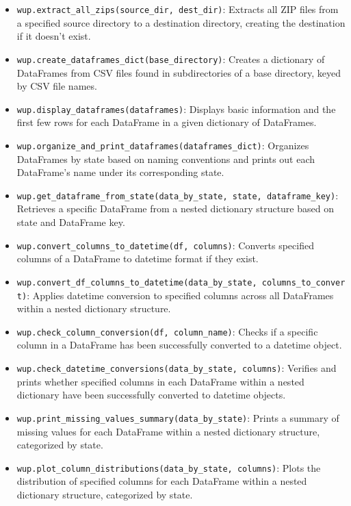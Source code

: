 \documentclass[
]{article}
\begin{document}
\begin{itemize}
\item
  \texttt{wup.extract\_all\_zips(source\_dir,\ dest\_dir)}: Extracts all
  ZIP files from a specified source directory to a destination
  directory, creating the destination if it doesn't exist.
\item
  \texttt{wup.create\_dataframes\_dict(base\_directory)}: Creates a
  dictionary of DataFrames from CSV files found in subdirectories of a
  base directory, keyed by CSV file names.
\item
  \texttt{wup.display\_dataframes(dataframes)}: Displays basic
  information and the first few rows for each DataFrame in a given
  dictionary of DataFrames.
\item
  \texttt{wup.organize\_and\_print\_dataframes(dataframes\_dict)}:
  Organizes DataFrames by state based on naming conventions and prints
  out each DataFrame's name under its corresponding state.
\item
  \texttt{wup.get\_dataframe\_from\_state(data\_by\_state,\ state,\ dataframe\_key)}:
  Retrieves a specific DataFrame from a nested dictionary structure
  based on state and DataFrame key.
\item
  \texttt{wup.convert\_columns\_to\_datetime(df,\ columns)}: Converts
  specified columns of a DataFrame to datetime format if they exist.
\item
  \texttt{wup.convert\_df\_columns\_to\_datetime(data\_by\_state,\ columns\_to\_convert)}:
  Applies datetime conversion to specified columns across all DataFrames
  within a nested dictionary structure.
\item
  \texttt{wup.check\_column\_conversion(df,\ column\_name)}: Checks if a
  specific column in a DataFrame has been successfully converted to a
  datetime object.
\item
  \texttt{wup.check\_datetime\_conversions(data\_by\_state,\ columns)}:
  Verifies and prints whether specified columns in each DataFrame within
  a nested dictionary have been successfully converted to datetime
  objects.
\item
  \texttt{wup.print\_missing\_values\_summary(data\_by\_state)}: Prints
  a summary of missing values for each DataFrame within a nested
  dictionary structure, categorized by state.
\item
  \texttt{wup.plot\_column\_distributions(data\_by\_state,\ columns)}:
  Plots the distribution of specified columns for each DataFrame within
  a nested dictionary structure, categorized by state.
\end{itemize}
\end{document}
